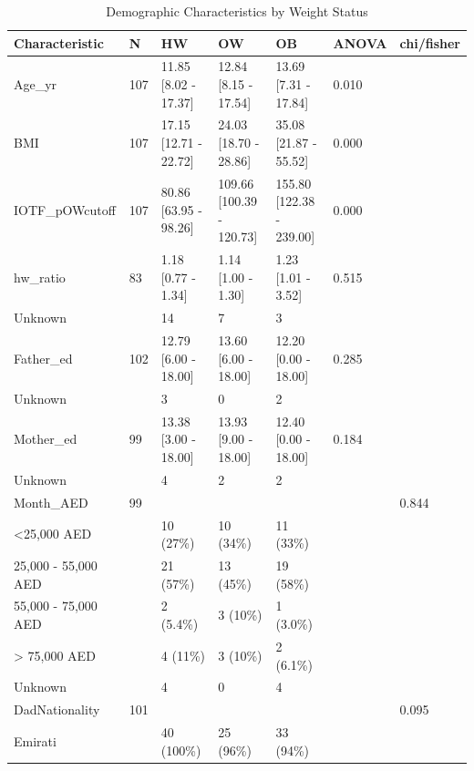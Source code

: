 \documentclass[
]{article}
\begin{document}
\begin{table}[!h]

\caption{\label{tab:Demo_OB_tab}Demographic Characteristics by Weight Status}
\centering
\begin{tabular}[t]{lllllll}
\toprule
Characteristic & N & HW & OW & OB & ANOVA & chi/fisher\\
\midrule
Age\_yr & 107 & 11.85 [8.02 - 17.37] & 12.84 [8.15 - 17.54] & 13.69 [7.31 - 17.84] & 0.010 & \\
BMI & 107 & 17.15 [12.71 - 22.72] & 24.03 [18.70 - 28.86] & 35.08 [21.87 - 55.52] & 0.000 & \\
IOTF\_pOWcutoff & 107 & 80.86 [63.95 - 98.26] & 109.66 [100.39 - 120.73] & 155.80 [122.38 - 239.00] & 0.000 & \\
hw\_ratio & 83 & 1.18 [0.77 - 1.34] & 1.14 [1.00 - 1.30] & 1.23 [1.01 - 3.52] & 0.515 & \\
\hspace{1em}Unknown &  & 14 & 7 & 3 &  & \\
\addlinespace
Father\_ed & 102 & 12.79 [6.00 - 18.00] & 13.60 [6.00 - 18.00] & 12.20 [0.00 - 18.00] & 0.285 & \\
\hspace{1em}Unknown &  & 3 & 0 & 2 &  & \\
Mother\_ed & 99 & 13.38 [3.00 - 18.00] & 13.93 [9.00 - 18.00] & 12.40 [0.00 - 18.00] & 0.184 & \\
\hspace{1em}Unknown &  & 4 & 2 & 2 &  & \\
Month\_AED & 99 &  &  &  &  & 0.844\\
\addlinespace
\hspace{1em}<25,000 AED &  & 10 (27\%) & 10 (34\%) & 11 (33\%) &  & \\
\hspace{1em}25,000 - 55,000 AED &  & 21 (57\%) & 13 (45\%) & 19 (58\%) &  & \\
\hspace{1em}55,000 - 75,000 AED &  & 2 (5.4\%) & 3 (10\%) & 1 (3.0\%) &  & \\
\hspace{1em}> 75,000 AED &  & 4 (11\%) & 3 (10\%) & 2 (6.1\%) &  & \\
\hspace{1em}Unknown &  & 4 & 0 & 4 &  & \\
\addlinespace
DadNationality & 101 &  &  &  &  & 0.095\\
\hspace{1em}Emirati &  & 40 (100\%) & 25 (96\%) & 33 (94\%) &  & \\

\end{tabular}
\end{table}
\end{document}
